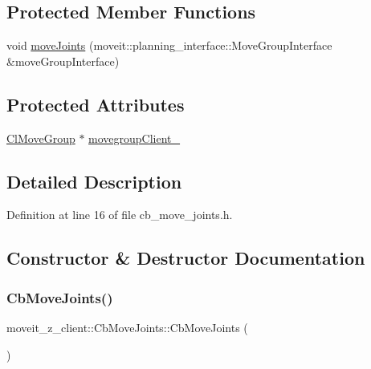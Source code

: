 \subsection*{Protected Member Functions}
\begin{DoxyCompactItemize}
\item 
void \hyperlink{classmoveit__z__client_1_1CbMoveJoints_a4dcc7bcf0ed857d9d580d4700cdeb5db}{move\+Joints} (moveit\+::planning\+\_\+interface\+::\+Move\+Group\+Interface \&move\+Group\+Interface)
\end{DoxyCompactItemize}
\subsection*{Protected Attributes}
\begin{DoxyCompactItemize}
\item 
\hyperlink{classmoveit__z__client_1_1ClMoveGroup}{Cl\+Move\+Group} $\ast$ \hyperlink{classmoveit__z__client_1_1CbMoveJoints_a2ce2e613b676025766dcd2f01ae50810}{movegroup\+Client\+\_\+}
\end{DoxyCompactItemize}


\subsection{Detailed Description}


Definition at line 16 of file cb\+\_\+move\+\_\+joints.\+h.



\subsection{Constructor \& Destructor Documentation}
\mbox{\label{classmoveit__z__client_1_1CbMoveJoints_a8d9f24fd96baa202c546654f3e92f51c}} 
\subsubsection{\texorpdfstring{Cb\+Move\+Joints()}{CbMoveJoints()}\hspace{0.1cm}{\footnotesize\ttfamily [1/2]}}
{\footnotesize\ttfamily moveit\+\_\+z\+\_\+client\+::\+Cb\+Move\+Joints\+::\+Cb\+Move\+Joints (\begin{DoxyParamCaption}{ }\end{DoxyParamCaption})}



